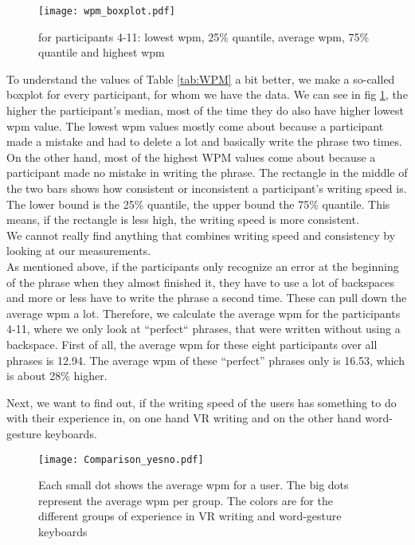 \begin{figure}[H]
    \centering
    \texttt{[image: wpm\_boxplot.pdf]}
    \caption{for participants 4-11: lowest wpm, 25\% quantile, average wpm, 75\% quantile and highest wpm}
    \label{fig:WPM}
\end{figure}
To understand the values of Table \ref{tab:WPM} a bit better, we make a so-called boxplot for every participant, for whom we have the data. We can see in fig \ref{fig:WPM}, the higher the participant's median, most of the time they do also have higher lowest wpm value. The lowest wpm values mostly come about because a participant made a mistake and had to delete a lot and basically write the phrase two times. On the other hand, most of the highest WPM values come about because a participant made no mistake in writing the phrase. The rectangle in the middle of the two bars shows how consistent or inconsistent a participant's writing speed is. The lower bound is the 25\% quantile, the upper bound the 75\% quantile. This means, if the rectangle is less high, the writing speed is more consistent.\\
We cannot really find anything that combines writing speed and consistency by looking at our measurements.\\
As mentioned above, if the participants only recognize an error at the beginning of the phrase when they almost finished it, they have to use a lot of backspaces and more or less have to write the phrase a second time. These can pull down the average wpm a lot. Therefore, we calculate the average wpm for the participants 4-11, where we only look at ``perfect`` phrases, that were written without using a backspace. First of all, the average wpm for these eight participants over all phrases is 12.94. The average wpm of these ``perfect'' phrases only is 16.53, which is about 28\% higher. 

Next, we want to find out, if the writing speed of the users has something to do with their experience in, on one hand VR writing and on the other hand word-gesture keyboards.\\

\begin{figure}[H]
    \centering
    \texttt{[image: Comparison\_yesno.pdf]}
    \caption{Each small dot shows the average wpm for a user. The big dots represent the average wpm per group. The colors are for the different groups of experience in VR writing and word-gesture keyboards}
    \label{fig:WPM_yesno}
\end{figure}

